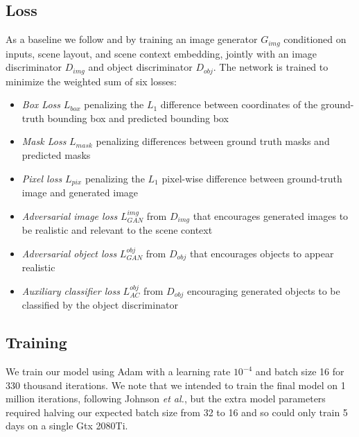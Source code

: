 \documentclass{article}
\begin{document}

\subsection{Loss}

As a baseline we follow \cite{sg2im} and \cite{sg2imgcontext} by training an image generator $G_{img}$ conditioned on inputs, scene layout, and scene context embedding, jointly with an image discriminator $D_{img}$ and object discriminator $D_{obj}$. The network is trained to minimize the weighted sum of six losses:
\begin{itemize}
\item \textit{Box Loss} $L_{box}$ penalizing the $L_1$ difference between coordinates of the ground-truth bounding box and predicted bounding box
\item \textit{Mask Loss} $L_{mask}$ penalizing differences between ground truth masks and predicted masks
\item \textit{Pixel loss} $L_{pix}$ penalizing the $L_1$ pixel-wise difference between ground-truth image and generated image
\item \textit{Adversarial image loss} $L_{GAN}^{img}$ from $D_{img}$ that encourages generated images to be realistic and relevant to the scene context
\item \textit{Adversarial object loss} $L_{GAN}^{obj}$ from $D_{obj}$ that encourages objects to appear realistic
\item \textit{Auxiliary classifier loss} $L_{AC}^{obj}$ from $D_{obj}$ encouraging generated objects to be classified by the object discriminator
\end{itemize}
\subsection{Training}
We train our model using Adam \cite{adam} with a learning rate $10^{-4}$ and batch size 16 for 330 thousand iterations. We note that we intended to train the final model on 1 million iterations, following Johnson \textit{et al.}, but the extra model parameters required halving our expected batch size from 32 to 16 and so could only train 5 days on a single Gtx 2080Ti.
\end{document}
